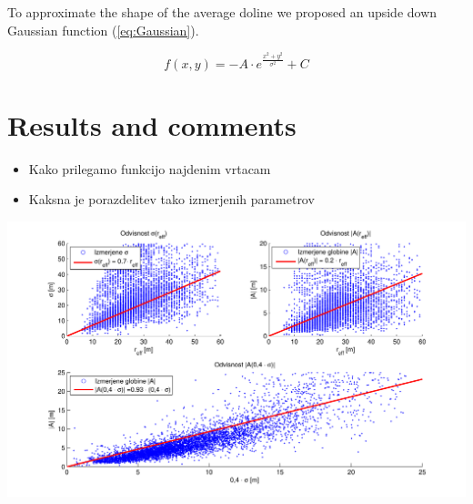 \documentclass[a0,portrait]{a0poster}
\begin{document}
\begin{multicols}{2}
To approximate the shape of the average doline we proposed an upside down Gaussian function (\ref{eq:Gaussian}).

\begin{equation}
	f(x,y) = - A \cdot e^{\frac{x^2 + y^2}{\sigma^2}} + C
	\label{eq:Gaussian}
\end{equation}


\section*{Results and comments}

\begin{itemize}
	\item Kako prilegamo funkcijo najdenim vrtacam
	\item Kaksna je porazdelitev tako izmerjenih parametrov
\end{itemize}

\begin{center}
\includegraphics[width=\linewidth]{menisija-A-sigma-reff.pdf}
\end{center}


\end{multicols}
\end{document}
